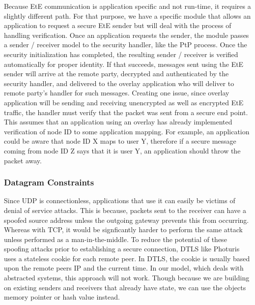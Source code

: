 \documentclass[conference]{IEEEtran}
\begin{document}
Because EtE communication is application specific and not run-time, it requires
a slightly different path.  For that purpose, we have a specific module that
allows an application to request a secure EtE sender but will deal with the
process of handling verification.  Once an application requests the sender, the
module passes a sender / receiver model to the security handler, like the PtP
process.  Once the security initialization has completed, the
resulting sender / receiver is verified automatically for proper identity.
If that succeeds, messages sent using the EtE sender will arrive at the remote
party, decrypted and authenticated by the security handler, and delivered to the
overlay application who will deliver to remote party's handler for such messages.
Creating one issue, since overlay application will be sending and receiving
unencrypted as well as encrypted EtE traffic, the handler must verify that the
packet was sent from a secure end point.  This assumes that an application using
an overlay has already implemented verification of node ID to some application
mapping.  For example, an application could be aware that node ID X maps to user
Y, therefore if a secure message coming from node ID Z says that it is user Y,
an application should throw the packet away.

\subsubsection{Datagram Constraints}
Since UDP is connectionless, applications that use it can easily be victims of
denial of service attacks.  This is because, packets sent to the receiver can
have a spoofed source address unless the outgoing gateway prevents this from
occurring.  Whereas with TCP, it would be signficantly harder to perform the
same attack unless performed as a man-in-the-middle.  To reduce the potential
of these spoofing attacks prior to establishing a secure connection, DTLS like
Photuris~\cite{photuris} uses a stateless cookie for each remote peer.  In
DTLS, the cookie is usually based upon the remote peers IP and the current
time.  In our model, which deals with abstracted systems, this approach will
not work.  Though because we are building on existing senders and receivers
that already have state, we can use the objects memory pointer or hash value
instead.
\end{document}
